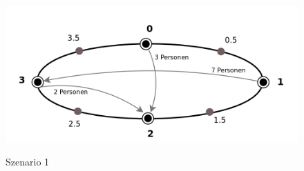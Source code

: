 \begin{figure}[H]	
\caption{Szenario 1}
\includegraphics[width=2\textwidth, width=470pt]{content/images/szenario1.png}
\label{pic:szenario1}
\end{figure}


